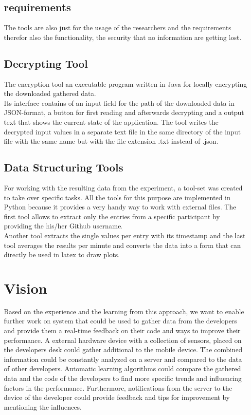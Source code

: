 \subsection{requirements}
The tools are also just for the usage of the researchers and the requirements therefor also the functionality, the security that no information are getting lost.

\subsection{Decrypting Tool}
The encryption tool an executable program written in Java for locally encrypting the downloaded gathered data.\\
Its interface contains of an input field for the path of the downloaded data in JSON-format, a button for first reading and afterwards decrypting and a output text that shows the current state of the application. The tool writes the decrypted input values in a separate text file in the same directory of the input file with the same name but with the file extension .txt instead of .json. 

\subsection{Data Structuring Tools}
For working with the resulting data from the experiment, a tool-set was created to take over specific tasks. All the tools for this purpose are implemented in Python because it provides a very handy way to work with external files. 
The first tool allows to extract only the entries from a specific participant by providing the his/her Github username.\\
Another tool extracts the single values per entry with its timestamp and the last tool averages the results per minute and converts the data into a form that can directly be used in latex to draw plots.

\section{Vision}
Based on the experience and the learning from this approach, we want to enable further work on system that could be used to gather data from the developers and provide them a real-time feedback on their code and ways to improve their performance.
A external hardware device with a collection of sensors, placed on the developers desk could gather additional to the mobile device. 
The combined information could be constantly analyzed on a server and compared to the data of other developers. Automatic learning algorithms could compare the gathered data and the code of the developers to find more specific trends and influencing factors in the performance. 
Furthermore, notifications from the server to the device of the developer could provide feedback and tips for improvement by mentioning the influences. 


